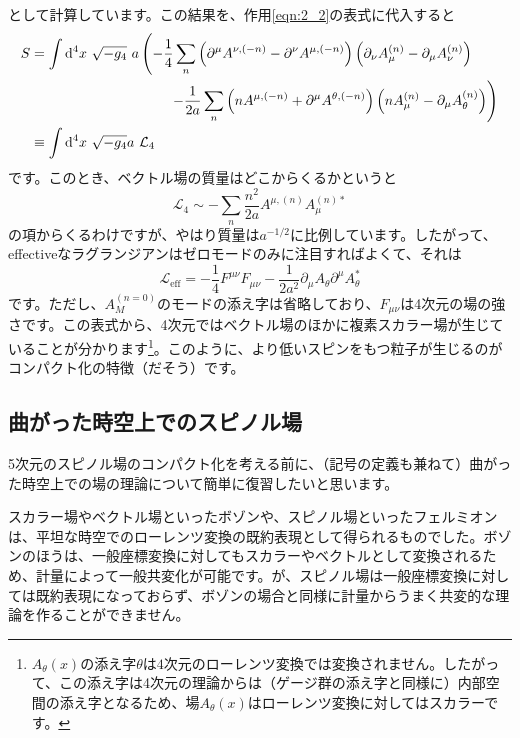 \documentclass[unicode,a4paper,11pt]{ltjsarticle}
\begin{document}
として計算しています。この結果を、作用\eqref{eqn:2_2}の表式に代入すると
\begin{align}
   S
    & =
   \int\dd^4 x\ \sqrt{-g_{4}}\
   a
   \left(
   -
   \frac{1}{4}
   \sum_{n}
   \left(
   \partial^{\mu}A^{\nu,(-n)}
   -
   \partial^{\nu}A^{\mu,(-n)}
   \right)
   \left(
   \partial_{\nu}A_{\mu}^{(n)}
   -
   \partial_{\mu}A_{\nu}^{(n)}
   \right)
   \right.
   \nonumber
   \\
    & \hspace*{3.5cm}
   \left.
   -
   \frac{1}{2a}
   \sum_{n}
   \left(
   nA^{\mu,(-n)}+\partial^{\mu}A^{\theta,(-n)}
   \right)
   \left(
   nA_{\mu}^{(n)}-\partial_{\mu}A_{\theta}^{(n)}
   \right)
   \right)
   \\
    & \equiv
   \int\dd^4 x\ \sqrt{-g_{4}}a\ \mathcal{L}_{4}
   \nonumber
\end{align}
です。このとき、ベクトル場の質量はどこからくるかというと
\begin{equation}
   \mathcal{L}_{4}
   \sim
   -\sum_{n}\frac{n^2}{2a}A^{\mu, (n)}A_{\mu}^{(n)\ast}
\end{equation}
の項からくるわけですが、やはり質量は$a^{-1/2}$に比例しています。したがって、effectiveなラグランジアンはゼロモードのみに注目すればよくて、それは
\begin{equation}
   \mathcal{L}_{\mathrm{eff}}
   =
   -\frac{1}{4}F^{\mu\nu}F_{\mu\nu}
   -\frac{1}{2a^2}\partial_{\mu}A_{\theta}\partial^{\mu}A_{\theta}^{\ast}
\end{equation}
です。ただし、$A_{M}^{(n=0)}$のモードの添え字は省略しており、$F_{\mu\nu}$は4次元の場の強さです。この表式から、4次元ではベクトル場のほかに複素スカラー場が生じていることが分かります\footnote{
   $A_{\theta}(x)$の添え字$\theta$は$4$次元のローレンツ変換では変換されません。したがって、この添え字は4次元の理論からは（ゲージ群の添え字と同様に）内部空間の添え字となるため、場$A_{\theta}(x)$はローレンツ変換に対してはスカラーです。
}。このように、より低いスピンをもつ粒子が生じるのがコンパクト化の特徴（だそう）です。



\subsection{曲がった時空上でのスピノル場}
\label{subsec:spinor_curved_spacetime}

5次元のスピノル場のコンパクト化を考える前に、（記号の定義も兼ねて）曲がった時空上での場の理論について簡単に復習したいと思います。

スカラー場やベクトル場といったボゾンや、スピノル場といったフェルミオンは、平坦な時空でのローレンツ変換の既約表現として得られるものでした。ボゾンのほうは、一般座標変換に対してもスカラーやベクトルとして変換されるため、計量によって一般共変化が可能です。が、スピノル場は一般座標変換に対しては既約表現になっておらず、ボゾンの場合と同様に計量からうまく共変的な理論を作ることができません。
\end{document}
